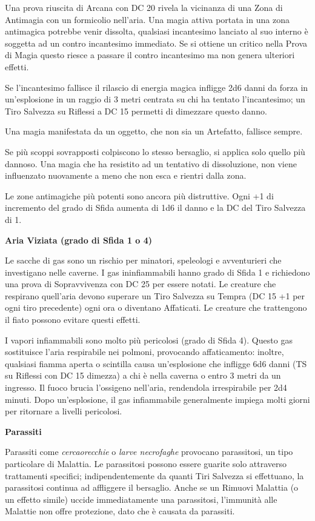 \begin{multicols}{2}
Una prova riuscita di Arcana con DC 20 rivela la vicinanza di una Zona di Antimagia con un formicolio nell'aria. Una magia attiva portata in una zona antimagica potrebbe venir dissolta, qualsiasi incantesimo lanciato al suo interno è soggetta ad un contro incantesimo immediato. Se si ottiene un critico nella Prova di Magia questo riesce a passare il contro incantesimo ma non genera ulteriori effetti.

Se l'incantesimo fallisce il rilascio di energia magica infligge 2d6 danni da forza in un'esplosione in un raggio di 3 metri centrata su chi ha tentato l'incantesimo; un Tiro Salvezza su Riflessi a DC 15 permetti di dimezzare questo danno.

Una magia manifestata da un oggetto, che non sia un Artefatto, fallisce sempre.

Se più scoppi sovrapposti colpiscono lo stesso bersaglio, si applica solo quello più dannoso. Una magia che ha resistito ad un tentativo di dissoluzione, non viene influenzato nuovamente a meno che non esca e rientri dalla zona.

Le zone antimagiche più potenti sono ancora più distruttive. Ogni +1 di incremento del grado di Sfida aumenta di 1d6 il danno e la DC del Tiro Salvezza di 1.

\medskip
\textbf{Aria Viziata (grado di Sfida 1 o 4)}

Le sacche di gas sono un rischio per minatori, speleologi e avventurieri che investigano nelle caverne. I gas ininfiammabili hanno grado di Sfida 1 e richiedono una prova di Sopravvivenza con DC 25 per essere notati. Le creature che respirano quell'aria devono superare un Tiro Salvezza su Tempra (DC 15 +1 per ogni tiro precedente) ogni ora o diventano Affaticati. Le creature che trattengono il fiato possono evitare questi effetti.

I vapori infiammabili sono molto più pericolosi (grado di Sfida 4). Questo gas sostituisce l'aria respirabile nei polmoni, provocando affaticamento: inoltre, qualsiasi fiamma aperta o scintilla causa un'esplosione che infligge 6d6 danni (TS su Riflessi con DC 15 dimezza) a chi è nella caverna o entro 3 metri da un ingresso. Il fuoco brucia l'ossigeno nell'aria, rendendola irrespirabile per 2d4 minuti. Dopo un'esplosione, il gas infiammabile generalmente impiega molti giorni per ritornare a livelli pericolosi.

\medskip
\textbf{Parassiti}

Parassiti come \emph{cercaorecchie} o \emph{larve necrofaghe} provocano parassitosi, un tipo particolare di Malattia. Le parassitosi possono essere guarite solo attraverso trattamenti specifici; indipendentemente da quanti Tiri Salvezza si effettuano, la parassitosi continua ad affliggere il bersaglio. Anche se un Rimuovi Malattia (o un effetto simile) uccide immediatamente una parassitosi, l'immunità alle Malattie non offre protezione, dato che è causata da parassiti.


\end{multicols}
